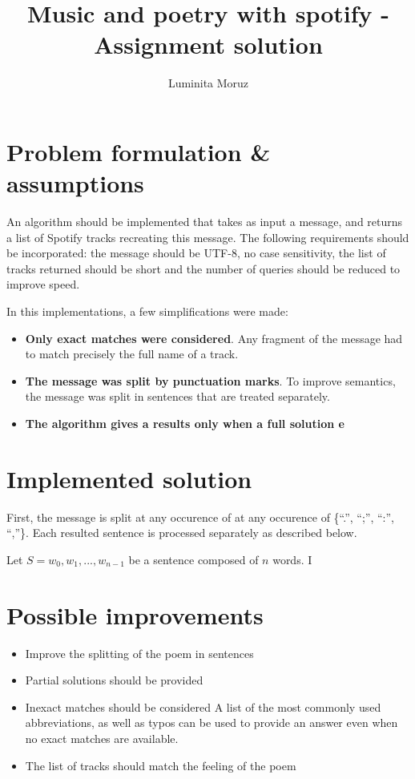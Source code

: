 \documentclass[12pt]{article}
\title{{\bf Music and poetry with spotify - Assignment solution}}
\author{
Luminita Moruz  \\
\hline
}
\begin{document}
\maketitle

\section{Problem formulation \& assumptions}
\label{sec:problem}
An algorithm should be implemented that takes as input a message, and
returns a list of Spotify tracks recreating this message. The
following requirements should be incorporated: the message should be
UTF-8, no case sensitivity, the list of tracks returned should be
short and the number of queries should be reduced to improve speed.

\vspace{0.15cm}

In this implementations, a few simplifications were made:
\begin{itemize}
\item {\bf Only exact matches were considered}. Any fragment of the
  message had to match precisely the full name of a track.

\item {\bf The message was split by punctuation marks}. To improve
  semantics, the message was split in sentences that are treated
  separately.

\item {\bf The algorithm gives a results only when a full solution e}
\end{itemize}
 

\section{Implemented solution}
First, the message is split at any occurence of at any occurence of
\{``.'', ``;'', ``:'', ``,''\}. Each resulted sentence is processed
separately as described below.

Let $S = w_0, w_1, ..., w_{n-1}$ be a sentence composed of $n$ words. I 


\section{Possible improvements}
\begin{itemize}
\item Improve the splitting of the poem in sentences

\item Partial solutions should be provided 

\item Inexact matches should be considered A list of the most
  commonly used abbreviations, as well as typos can be used to provide
  an answer even when no exact matches are available. 

\item The list of tracks should match the feeling of the poem
\end{itemize}
\end{document}
